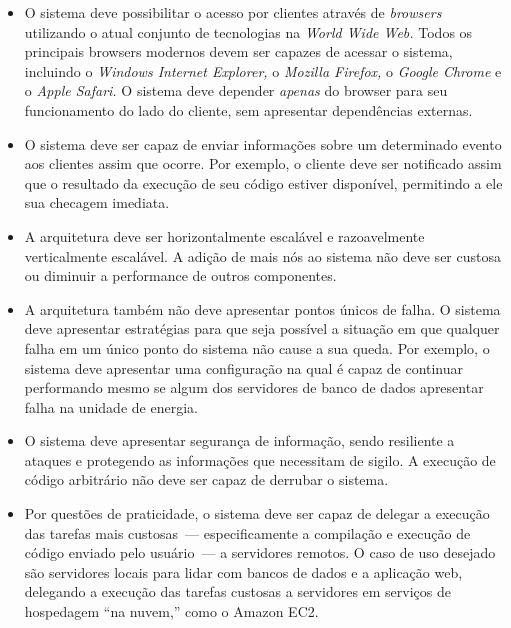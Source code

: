 \documentclass[ruledheader, 12pt]{abnt}
\begin{document}
\begin{itemize}
	\item O sistema deve possibilitar o acesso por clientes através de \emph{browsers} utilizando o atual conjunto de tecnologias na \emph{World Wide Web.} Todos os principais browsers modernos devem ser capazes de acessar o sistema, incluindo o \emph{Windows Internet Explorer,} o \emph{Mozilla Firefox,} o \emph{Google Chrome} e o \emph{Apple Safari.} O sistema deve depender \emph{apenas} do browser para seu funcionamento do lado do cliente, sem apresentar dependências externas.
	
	\item O sistema deve ser capaz de enviar informações sobre um determinado evento aos clientes assim que ocorre. Por exemplo, o cliente deve ser notificado assim que o resultado da execução de seu código estiver disponível, permitindo a ele sua checagem imediata.
	
	\item A arquitetura deve ser horizontalmente escalável e razoavelmente verticalmente escalável. A adição de mais nós ao sistema não deve ser custosa ou diminuir a performance de outros componentes.
	
	\item A arquitetura também não deve apresentar pontos únicos de falha. O sistema deve apresentar estratégias para que seja possível a situação em que qualquer falha em um único ponto do sistema não cause a sua queda. Por exemplo, o sistema deve apresentar uma configuração na qual é capaz de continuar performando mesmo se algum dos servidores de banco de dados apresentar falha na unidade de energia.
	
	\item O sistema deve apresentar segurança de informação, sendo resiliente a ataques e protegendo as informações que necessitam de sigilo. A execução de código arbitrário não deve ser capaz de derrubar o sistema.
	
	
	\item Por questões de praticidade, o sistema deve ser capaz de delegar a execução das tarefas mais custosas~--- especificamente a compilação e execução de código enviado pelo usuário~--- a servidores remotos. O caso de uso desejado são servidores locais para lidar com bancos de dados e a aplicação web, delegando a execução das tarefas custosas a servidores em serviços de hospedagem ``na nuvem,'' como o Amazon EC2.
\end{itemize}
\end{document}
